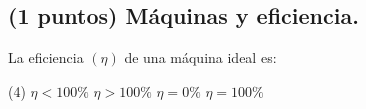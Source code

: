 \documentclass[12pt, letter]{exam}
\begin{document}
\begin{questions}

    \section{(1 puntos) Máquinas y eficiencia.}

    \question La eficiencia $(\eta)$ de una máquina ideal es:
    \begin{tasks}(4)
        \task $\eta < 100 \%$
        \task $\eta > 100 \%$
        \task $\eta = 0 \%$
        \task $\eta = 100 \%$
    \end{tasks}
    

\end{questions}
\end{document}
